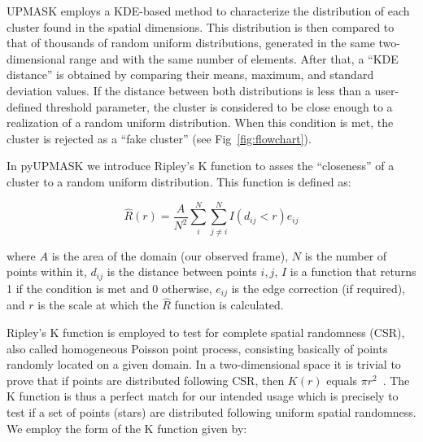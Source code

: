 \documentclass{aa}
\begin{document}
 UPMASK employs a KDE-based method to characterize the distribution of each
 cluster found in the spatial dimensions. This distribution is then compared
 to that of thousands of random uniform distributions, generated in the same
 two-dimensional range and with the same number of elements. After that,
 a ``KDE distance'' is obtained by comparing their means, maximum, and
 standard deviation values.
 If the distance between both distributions is less than a user-defined
 threshold parameter, the cluster is considered to be close enough to a
 realization of a random uniform distribution. When this condition is met, the
 cluster is rejected as a ``fake cluster'' (see Fig~\ref{fig:flowchart}).

 In pyUPMASK we introduce Ripley's K function \citep{ripley_1976,ripley_1979}
 to asses the ``closeness'' of a cluster to a random uniform distribution. This
 function is defined as:

 \begin{equation}
 \hat{R}(r) = \frac{A}{N^2} \sum_i^N \sum_{j\neq i}^N I(d_{ij} < r) e_{ij}
 \end{equation}

 \noindent where $A$ is the area of the domain (our observed frame), $N$ is
 the number of points within it, $d_{ij}$ is the distance between points
 $i,j$, $I$ is a function that returns 1 if the condition is met and 0
 otherwise, $e_{ij}$ is the edge correction (if required), and $r$ is the
 scale at which the $ \hat{R}$ function is calculated.

 Ripley's K function is employed to test for complete spatial randomness (CSR),
 also called homogeneous Poisson point process, consisting basically of
 points randomly located on a given domain. In a two-dimensional space it is
 trivial to prove that if points are distributed following CSR, then $K(r)$
 equals $\pi r^2$~\citep{Streib_2011}.
 The K function is thus a perfect match for our intended usage which is
 precisely to test if a set of points (stars) are distributed following
 uniform spatial randomness.
 We employ the form of the K function given by:


\end{document}
